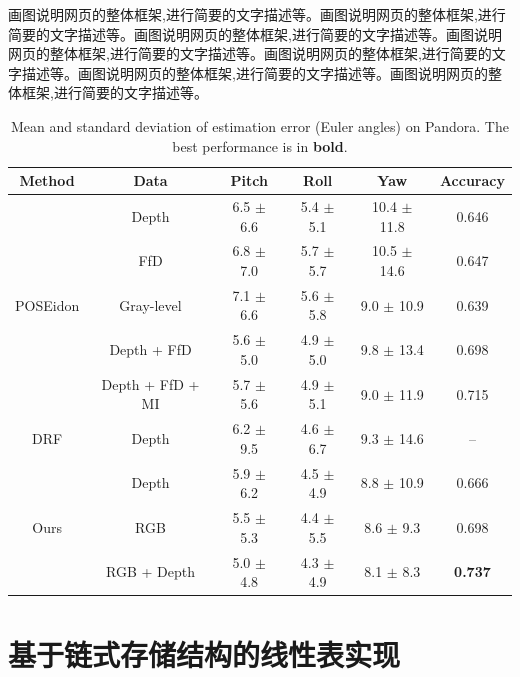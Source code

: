 \documentclass[supercite]{Experimental_Report}
\theoremstyle{definition}
\begin{document}
画图说明网页的整体框架,进行简要的文字描述等。画图说明网页的整体框架,进行简要的文字描述等。画图说明网页的整体框架,进行简要的文字描述等。画图说明网页的整体框架,进行简要的文字描述等。画图说明网页的整体框架,进行简要的文字描述等。画图说明网页的整体框架,进行简要的文字描述等。画图说明网页的整体框架,进行简要的文字描述等。

\begin{table}
	\begin{center}
		\setlength{\tabcolsep}{2.0mm}
		\caption{Mean and standard deviation of estimation error (Euler angles) on Pandora. The best performance is in \textbf{bold}.}
		\label{table2}
		\begin{tabular}{c|ccccc}
			\hline
			Method    			        & Data               & Pitch         & Roll           & Yaw              & Accuracy\\
			\hline
			\hline			
			\multirow{5}{*}{POSEidon}   & Depth              & 6.5 $\pm$ 6.6  & 5.4 $\pm$ 5.1  & 10.4 $\pm$ 11.8  & 0.646\\
			& FfD              	 & 6.8 $\pm$ 7.0  & 5.7 $\pm$ 5.7  & 10.5 $\pm$ 14.6  & 0.647\\
			& Gray-level         & 7.1 $\pm$ 6.6  & 5.6 $\pm$ 5.8  & 9.0  $\pm$ 10.9  & 0.639\\
			& Depth + FfD	     & 5.6 $\pm$ 5.0  & 4.9 $\pm$ 5.0  & 9.8  $\pm$ 13.4  & 0.698\\
			& Depth + FfD + MI   & 5.7 $\pm$ 5.6  & 4.9 $\pm$ 5.1  & 9.0  $\pm$ 11.9  & 0.715\\
			\hline
			DRF                         & Depth              & 6.2 $\pm$ 9.5  & 4.6 $\pm$ 6.7  & 9.3  $\pm$ 14.6  & --\\
			\hline
			\multirow{3}{*}{Ours}   	& Depth              & 5.9 $\pm$ 6.2  & 4.5 $\pm$ 4.9  & 8.8  $\pm$ 10.9  & 0.666\\
			& RGB                & 5.5 $\pm$ 5.3  & 4.4 $\pm$ 5.5  & 8.6  $\pm$ 9.3   & 0.698\\
			& RGB + Depth        & 5.0 $\pm$ 4.8  & 4.3 $\pm$ 4.9  & 8.1  $\pm$ 8.3   & \textbf{0.737}\\
			\hline
		\end{tabular}
	\end{center}
\end{table}

\newpage

\section{基于链式存储结构的线性表实现}
\end{document}
